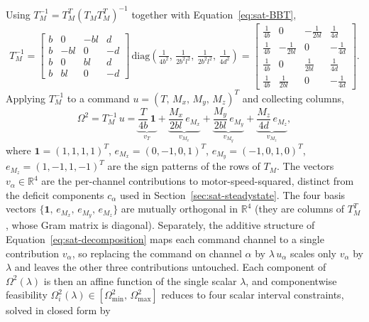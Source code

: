 \documentclass[conf]{new-aiaa}
\begin{document}
Using $T_M^{-1} = T_M^T (T_M T_M^T)^{-1}$ together with Equation~\ref{eq:sat-BBT},
\small
\begin{equation}
\label{eq:sat-TMinv}
T_M^{-1}
= \begin{bmatrix}
b & 0 & -bl & d \\
b & -bl & 0 & -d \\
b & 0 & bl & d \\
b & bl & 0 & -d
\end{bmatrix}
\,
\mathrm{diag}\!\left(\tfrac{1}{4 b^2},\, \tfrac{1}{2 b^2 l^2},\, \tfrac{1}{2 b^2 l^2},\, \tfrac{1}{4 d^2}\right)
= \begin{bmatrix}
\tfrac{1}{4 b} & 0 & -\tfrac{1}{2 b l} & \tfrac{1}{4 d} \\[2pt]
\tfrac{1}{4 b} & -\tfrac{1}{2 b l} & 0 & -\tfrac{1}{4 d} \\[2pt]
\tfrac{1}{4 b} & 0 & \tfrac{1}{2 b l} & \tfrac{1}{4 d} \\[2pt]
\tfrac{1}{4 b} & \tfrac{1}{2 b l} & 0 & -\tfrac{1}{4 d}
\end{bmatrix}.
\end{equation}
\normalsize
Applying $T_M^{-1}$ to a command $u = (T,\, M_x,\, M_y,\, M_z)^T$ and collecting columns,
\small
\begin{equation}
\label{eq:sat-decomposition}
\Omega^2 = T_M^{-1}\, u =
\underbrace{\frac{T}{4 b}\, \mathbf{1}}_{v_T}
+ \underbrace{\frac{M_x}{2 b l}\, e_{M_x}}_{v_{M_x}}
+ \underbrace{\frac{M_y}{2 b l}\, e_{M_y}}_{v_{M_y}}
+ \underbrace{\frac{M_z}{4 d}\, e_{M_z}}_{v_{M_z}},
\end{equation}
\normalsize
where $\mathbf{1} = (1,1,1,1)^T$, $e_{M_x} = (0,-1,0,1)^T$, $e_{M_y} = (-1,0,1,0)^T$, $e_{M_z} = (1,-1,1,-1)^T$ are the sign patterns of the rows of $T_M$. The vectors $v_\alpha \in \mathbb{R}^4$ are the per-channel contributions to motor-speed-squared, distinct from the deficit components $c_\alpha$ used in Section~\ref{sec:sat-steadystate}. The four basis vectors $\{\mathbf{1},\, e_{M_x},\, e_{M_y},\, e_{M_z}\}$ are mutually orthogonal in $\mathbb{R}^4$ (they are columns of $T_M^T$, whose Gram matrix is diagonal). Separately, the additive structure of Equation~\ref{eq:sat-decomposition} maps each command channel to a single contribution $v_\alpha$, so replacing the command on channel $\alpha$ by $\lambda\, u_\alpha$ scales only $v_\alpha$ by $\lambda$ and leaves the other three contributions untouched. Each component of $\Omega^2(\lambda)$ is then an affine function of the single scalar $\lambda$, and componentwise feasibility $\Omega^2_i(\lambda) \in [\Omega^2_{\min},\, \Omega^2_{\max}]$ reduces to four scalar interval constraints, solved in closed form by
\end{document}
